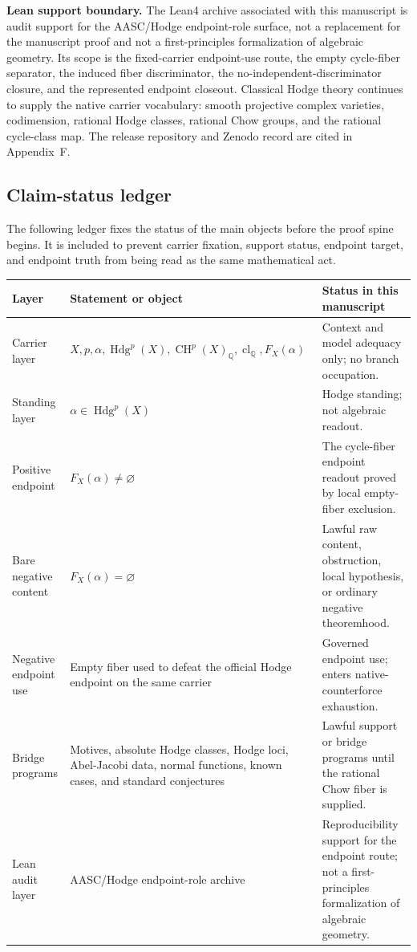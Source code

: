 \documentclass[11pt]{article}
\newcommand{\QQ}{\mathbb{Q}}
\newcommand{\CH}{\operatorname{CH}}
\newcommand{\Hdg}{\operatorname{Hdg}}
\newcommand{\clQ}{\operatorname{cl}_{\QQ}}
\begin{document}
\par\noindent\textbf{Lean support boundary.} The Lean4 archive associated with this manuscript is audit support for the AASC/Hodge endpoint-role surface, not a replacement for the manuscript proof and not a first-principles formalization of algebraic geometry. Its scope is the fixed-carrier endpoint-use route, the empty cycle-fiber separator, the induced fiber discriminator, the no-independent-discriminator closure, and the represented endpoint closeout. Classical Hodge theory continues to supply the native carrier vocabulary: smooth projective complex varieties, codimension, rational Hodge classes, rational Chow groups, and the rational cycle-class map. The release repository and Zenodo record are cited in Appendix~F.


\subsection*{Claim-status ledger}

The following ledger fixes the status of the main objects before the proof spine begins.  It is included to prevent carrier fixation, support status, endpoint target, and endpoint truth from being read as the same mathematical act.

{\small
\begin{longtable}{p{}p{}p{}}
\toprule
Layer & Statement or object & Status in this manuscript\\
\midrule
\endhead
Carrier layer & $X,p,\alpha,\Hdg^p(X),\CH^p(X)_\QQ,\clQ,F_X(\alpha)$ & Context and model adequacy only; no branch occupation.\\
Standing layer & $\alpha\in\Hdg^p(X)$ & Hodge standing; not algebraic readout.\\
Positive endpoint & $F_X(\alpha)\neq\varnothing$ & The cycle-fiber endpoint readout proved by local empty-fiber exclusion.\\
Bare negative content & $F_X(\alpha)=\varnothing$ & Lawful raw content, obstruction, local hypothesis, or ordinary negative theoremhood.\\
Negative endpoint use & Empty fiber used to defeat the official Hodge endpoint on the same carrier & Governed endpoint use; enters native-counterforce exhaustion.\\
Bridge programs & Motives, absolute Hodge classes, Hodge loci, Abel-Jacobi data, normal functions, known cases, and standard conjectures & Lawful support or bridge programs until the rational Chow fiber is supplied.\\
Lean audit layer & AASC/Hodge endpoint-role archive & Reproducibility support for the endpoint route; not a first-principles formalization of algebraic geometry.\\
\bottomrule
\end{longtable}
}
\end{document}

